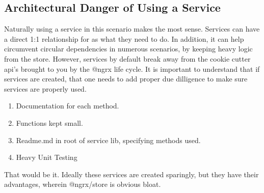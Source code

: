 \subsection{Architectural Danger of Using a Service}
Naturally using a service in this scenario makes the most sense. Services can
have a direct 1:1 relationship for as what they need to do. In addition, it can
help circumvent circular dependencies in numerous scenarios, by keeping heavy
logic from the store. However, services by default break away from the cookie
cutter api's brought to you by the @ngrx life cycle. It is important to
understand that if services are created, that one needs to add proper due
dilligence to make sure services are properly used.
\begin{enumerate}
  \item Documentation for each method.
  \item Functions kept small.
  \item Readme.md in root of service lib, specifying methods used.
  \item Heavy Unit Testing
\end{enumerate}

That would be it. Ideally these services are created sparingly, but they have
their advantages, wherein @ngrx/store is obvious bloat.

